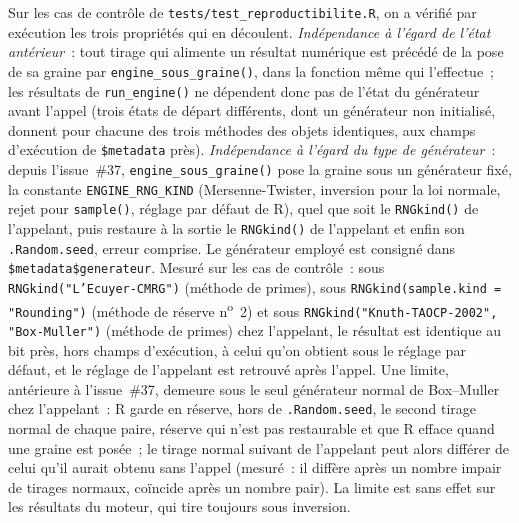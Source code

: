\documentclass[a4paper,11pt]{article}
\newcommand{\code}[1]{\texttt{\small #1}}
\begin{document}
Sur les cas de contrôle de \code{tests/test\_reproductibilite.R}, on a vérifié
par exécution les trois propriétés qui en découlent.
\emph{Indépendance à l'égard de l'état antérieur}~: tout tirage qui alimente un
résultat numérique est précédé de la pose de sa graine par \code{engine\_sous\_graine()},
dans la fonction même qui l'effectue~; les résultats de \code{run\_engine()} ne dépendent donc
pas de l'état du générateur avant l'appel (trois états de départ différents, dont un
générateur non initialisé, donnent pour chacune des trois méthodes des objets
identiques, aux champs d'exécution de \code{\$metadata} près).
\emph{Indépendance à l'égard du type de générateur}~: depuis l'issue~\#37,
\code{engine\_sous\_graine()} pose la graine sous un générateur fixé, la constante
\code{ENGINE\_RNG\_KIND} (Mersenne-Twister, inversion pour la loi normale, rejet pour
\code{sample()}, réglage par défaut de R), quel que soit le \code{RNGkind()} de l'appelant,
puis restaure à la sortie le \code{RNGkind()} de l'appelant et enfin son \code{.Random.seed},
erreur comprise. Le générateur employé est consigné dans \code{\$metadata\$generateur}. Mesuré
sur les cas de contrôle~: sous \code{RNGkind("L'Ecuyer-CMRG")} (méthode de primes), sous
\code{RNGkind(sample.kind = "Rounding")} (méthode de réserve n\textsuperscript{o}~2) et sous
\code{RNGkind("Knuth-TAOCP-2002", "Box-Muller")} (méthode de primes) chez l'appelant, le résultat
est identique au bit près, hors champs d'exécution, à celui qu'on obtient sous le réglage par
défaut, et le réglage de l'appelant est retrouvé après l'appel. Une limite, antérieure à
l'issue~\#37, demeure sous le seul générateur normal de Box--Muller chez l'appelant~: R garde en
réserve, hors de \code{.Random.seed}, le second tirage normal de chaque paire, réserve qui n'est
pas restaurable et que R efface quand une graine est posée~; le tirage normal suivant de
l'appelant peut alors différer de celui qu'il aurait obtenu sans l'appel (mesuré~: il diffère
après un nombre impair de tirages normaux, coïncide après un nombre pair). La limite est sans
effet sur les résultats du moteur, qui tire toujours sous inversion.
\end{document}
